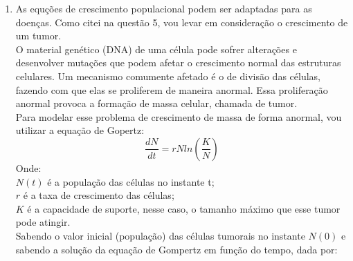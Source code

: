 \documentclass[a4paper]{article}
\begin{document}
\begin{enumerate}
Outro t\'opico interessante seria o crescimento de tumores.
\\
A grande maioria dos exemplos dado em sala, foram relacionados a din\^amica populacional com ou sem competi\c{c}\~ao e decaimento de poluentes, mostrando como isso afeta popula\c{c}\~oes. Contudo, exemplos com doen\c{c}as foram abordados apenas no final do curso. Esse tipo de exemplo daria mais dinamismo a aula.
\\
\item
As equ\c{c}\~oes de crescimento populacional podem ser adaptadas para as doen\c{c}as. Como citei na quest\~ao 5, vou levar em considera\c{c}\~ao o crescimento de um tumor.
\\
O material gen\'etico (DNA) de uma c\'elula pode sofrer altera\c{c}\~oes e desenvolver muta\c{c}\~oes que podem afetar o crescimento normal das estruturas celulares. Um mecanismo comumente afetado \'e o de divis\~ao das c\'elulas, fazendo com que elas se proliferem de maneira anormal. Essa prolifera\c{c}\~ao anormal provoca a forma\c{c}\~ao de massa celular, chamada de tumor.
\\
Para modelar esse problema de crescimento de massa de forma anormal, vou utilizar a equa\c{c}\~ao de Gopertz:
\\
\begin{equation}
\frac{dN}{dt} = r N ln (\frac{K}{N})
\end{equation}
Onde:
\\
$N(t)$ \'e a popula\c{c}\~ao das c\'elulas no instante t;
\\
$r$ \'e a taxa de crescimento das c\'elulas;
\\
$K$ \'e a capacidade de suporte, nesse caso, o tamanho m\'aximo que esse tumor pode atingir.
\\
Sabendo o valor inicial (popula\c{c}\~ao) das c\'elulas tumorais no instante $N(0)$ e sabendo a solu\c{c}\~ao da equa\c{c}\~ao de Gompertz em fun\c{c}\~ao do tempo, dada por:

\end{enumerate}
\end{document}
